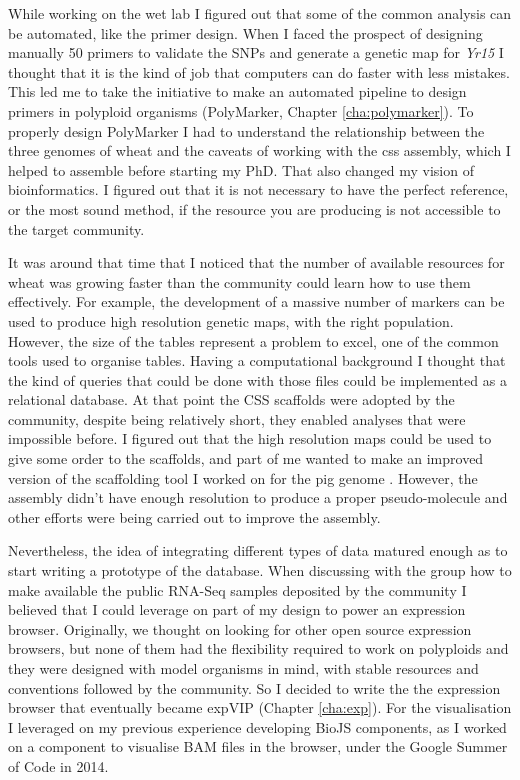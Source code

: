 While working on the wet lab I figured out that some of the common analysis can be automated, like the primer design. 
When I faced the prospect of designing manually 50 primers to validate the SNPs and generate a genetic map for \textit{Yr15} I thought that it is the kind of job that computers can do faster with less mistakes. 
This led me to take the initiative to make an automated pipeline to design primers in polyploid organisms (PolyMarker, Chapter \ref{cha:polymarker}).
To properly design PolyMarker I had to understand the relationship between the three genomes of wheat and the caveats of working with the \acrshort{css} assembly, which I helped to assemble before starting my PhD. 
That also changed my vision of bioinformatics. 
I figured out that it is not necessary to have the perfect reference, or the most sound method, if the resource you are producing is not accessible to the target community. 

It was around that time that I noticed that the number of available resources for wheat was growing faster than the community could learn how to use them effectively. 
For example, the development of a massive number of markers can be used to produce high resolution genetic maps, with the right population. 
However, the size of the tables represent a problem to excel, one of the common tools used to organise tables. 
Having a computational background I thought that the kind of queries that could be done with those files could be implemented as a relational database. 
At that point the CSS scaffolds were adopted by the community, despite being relatively short, they enabled analyses that were impossible before. 
I figured out that the high resolution maps could be used to give some order to the scaffolds, and part of me wanted to make an improved version of the scaffolding tool I worked on for the pig genome \citep{Groenen2012a}.
However, the assembly didn't have enough resolution to produce a proper pseudo-molecule and other efforts were being carried out to improve the assembly.

Nevertheless, the idea of integrating different types of data matured enough as to start writing a prototype of the database. 
When discussing with the group how to make available the public RNA-Seq samples deposited by the community I believed that I could leverage on part of my design to power an expression browser. 
Originally, we thought on looking for other open source expression browsers, but none of them had the flexibility required to work on polyploids and they were designed with model organisms in mind, with stable resources and conventions followed by the community. 
So I decided to write the the expression browser that eventually became expVIP (Chapter \ref{cha:exp}). 
For the visualisation I leveraged on my previous experience developing BioJS components, as I worked on a component to visualise BAM files in the browser, under the Google Summer of Code in 2014. 

